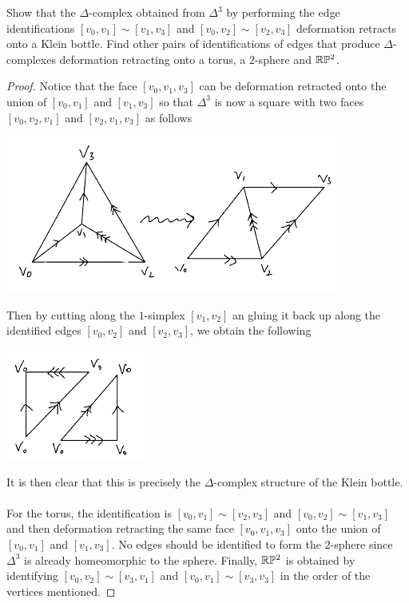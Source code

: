 \documentclass[a4paper]{article}
\begin{document}
\begin{ex}{}{} Show that the $\Delta$-complex obtained from $\Delta^3$ by performing the edge identifications $[v_0,v_1]\sim[v_1,v_3]$ and $[v_0,v_2]\sim[v_2,v_3]$ deformation retracts onto a Klein bottle. Find other pairs of identifications of edges that produce $\Delta$-complexes deformation retracting onto a torus, a $2$-sphere and $\mathbb{R}\mathbb{P}^2$. \tcbline
\begin{proof}
Notice that the face $[v_0,v_1,v_3]$ can be deformation retracted onto the union of $[v_0,v_1]$ and $[v_1,v_3]$ so that $\Delta^3$ is now a square with two faces $[v_0,v_2,v_1]$ and $[v_2,v_1,v_3]$ as follows 

\begin{center}
\includegraphics[scale = 0.8]{Image 4}
\end{center}

Then by cutting along the $1$-simplex $[v_1,v_2]$ an gluing it back up along the identified edges $[v_0,v_2]$ and $[v_2,v_3]$, we obtain the following 

\begin{center}
\includegraphics[scale = 0.8]{Image 5}
\end{center}

It is then clear that this is precisely the $\Delta$-complex structure of the Klein bottle. \\~\\

For the torus, the identification is $[v_0,v_1]\sim[v_2,v_3]$ and $[v_0,v_2]\sim[v_1,v_3]$ and then deformation retracting the same face $[v_0,v_1,v_3]$ onto the union of $[v_0,v_1]$ and $[v_1,v_3]$. No edges should be identified to form the $2$-sphere since $\Delta^3$ is already homeomorphic to the sphere. Finally, $\mathbb{R}\mathbb{P}^2$ is obtained by identifying $[v_0,v_2]\sim[v_3,v_1]$ and $[v_0,v_1]\sim[v_3,v_3]$ in the order of the vertices mentioned. 
\end{proof}
\end{ex}
\end{document}
